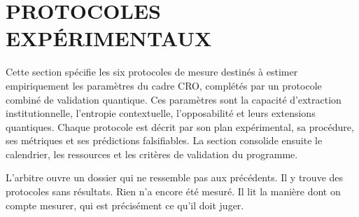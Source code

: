 
\section{PROTOCOLES EXP\'ERIMENTAUX}
\label{sec:protocoles_experimentaux}
\begin{sloppypar}
Cette section sp\'ecifie les six protocoles de mesure destin\'es \`a estimer
empiriquement les param\`etres du cadre CRO, compl\'et\'es par un protocole combin\'e
de validation quantique. Ces param\`etres sont la capacit\'e
d'extraction institutionnelle, l'entropie contextuelle, l'opposabilit\'e et leurs
extensions quantiques. Chaque protocole est d\'ecrit par son plan exp\'erimental, sa
proc\'edure, ses m\'etriques et ses pr\'edictions falsifiables. La section consolide
ensuite le calendrier, les ressources et les crit\`eres de validation du programme.
\end{sloppypar}

\begin{boiteArbitre}
L'arbitre ouvre un dossier qui ne ressemble pas aux pr\'ec\'edents. Il
y trouve des protocoles sans r\'esultats. Rien n'a encore \'et\'e mesur\'e.
Il lit la mani\`ere dont on compte mesurer, qui est pr\'ecis\'ement ce qu'il
doit juger.
\end{boiteArbitre}

